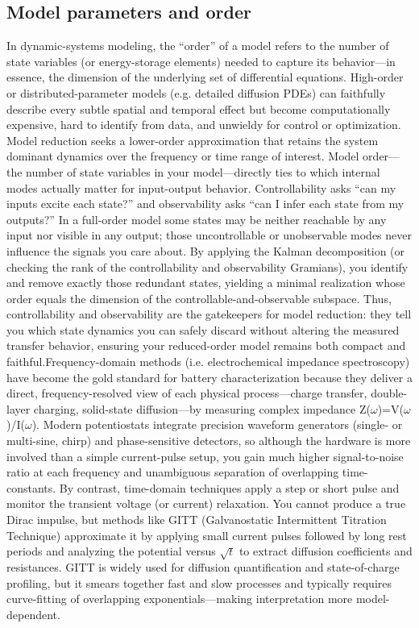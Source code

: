 \subsection{Model parameters and order}
In dynamic-systems modeling, the “order” of a model refers to the number of state variables (or energy-storage elements) needed to capture its behavior—in essence, the dimension of the underlying set of differential equations. High-order or distributed-parameter models (e.g. detailed diffusion PDEs) can faithfully describe every subtle spatial and temporal effect but become computationally expensive, hard to identify from data, and unwieldy for control or optimization. Model reduction seeks a lower-order approximation that retains the system dominant dynamics over the frequency or time range of interest.
Model order—the number of state variables in your model—directly ties to which internal modes actually matter for input-output behavior. Controllability asks “can my inputs excite each state?” and observability asks “can I infer each state from my outputs?” In a full-order model some states may be neither reachable by any input nor visible in any output; those uncontrollable or unobservable modes never influence the signals you care about. By applying the Kalman decomposition (or checking the rank of the controllability and observability Gramians), you identify and remove exactly those redundant states, yielding a minimal realization whose order equals the dimension of the controllable-and-observable subspace. Thus, controllability and observability are the gatekeepers for model reduction: they tell you which state dynamics you can safely discard without altering the measured transfer behavior, ensuring your reduced-order model remains both compact and faithful.Frequency-domain methods (i.e. electrochemical impedance spectroscopy) have become the gold standard for battery characterization because they deliver a direct, frequency-resolved view of each physical process—charge transfer, double-layer charging, solid-state diffusion—by measuring complex impedance Z($\omega$)=V($\omega$)/I($\omega$). Modern potentiostats integrate precision waveform generators (single- or multi-sine, chirp) and phase-sensitive detectors, so although the hardware is more involved than a simple current-pulse setup, you gain much higher signal-to-noise ratio at each frequency and unambiguous separation of overlapping time-constants.
By contrast, time-domain techniques apply a step or short pulse and monitor the transient voltage (or current) relaxation. You cannot produce a true Dirac impulse, but methods like GITT (Galvanostatic Intermittent Titration Technique) approximate it by applying small current pulses followed by long rest periods and analyzing the potential versus $\sqrt{t}$ to extract diffusion coefficients and resistances. GITT is widely used for diffusion quantification and state-of-charge profiling, but it smears together fast and slow processes and typically requires curve-fitting of overlapping exponentials—making interpretation more model-dependent.

